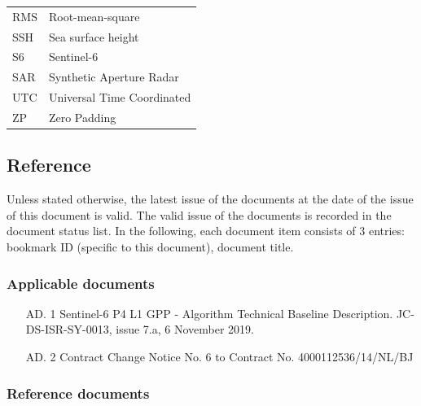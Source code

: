 \documentclass[11pt,a4paper]{article}
\begin{document}
\begin{table}[ht!]
\hspace{-0.2cm}\begin{tabular}{m{}m{}}
RMS & Root-mean-square \\

SSH & Sea surface height \\

S6 & Sentinel-6 \\

SAR & Synthetic Aperture Radar \\

UTC & Universal Time Coordinated \\

ZP &  Zero Padding \\ 



\end{tabular}
\end{table}



\subsection{Reference}

Unless stated otherwise, the latest issue of the documents at the date of the issue of this document is valid. The valid issue of the documents is recorded in the document status list. In the following, each document item consists of 3 entries: bookmark ID (specific to this document), document title.


\subsubsection{Applicable documents}

\begin{itemize}
 \item [AD. 1] Sentinel-6 P4 L1 GPP - Algorithm Technical Baseline Description. JC-DS-ISR-SY-0013, issue 7.a, 6 November 2019.
 \item [AD. 2] Contract Change Notice No. 6 to Contract No. 4000112536/14/NL/BJ

\end{itemize}


\subsubsection{Reference documents}
\end{document}

